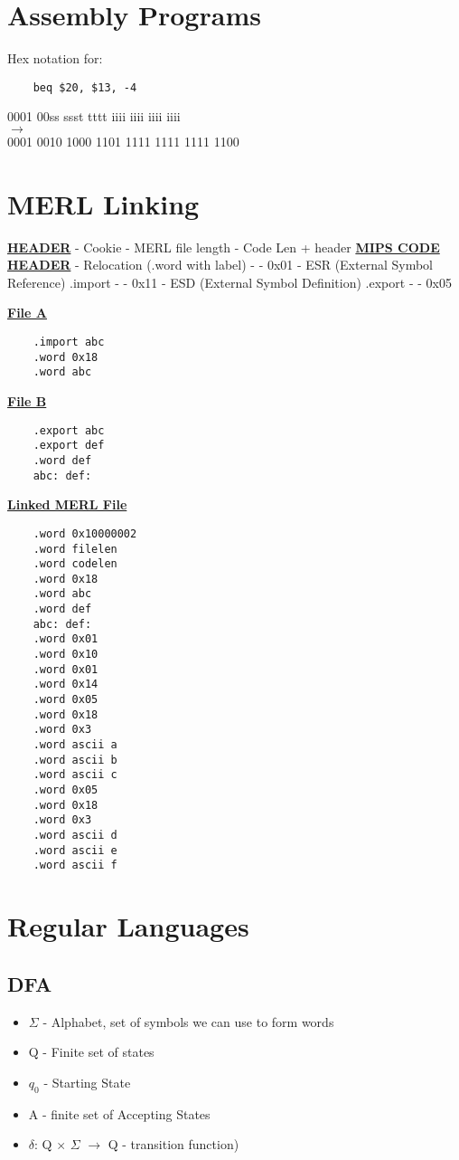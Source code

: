 \documentclass[12pt]{article}
\newcommand{\myt}[1]{\textbf{\underline{#1}}}
\begin{document}
	\section*{Assembly Programs}
	Hex notation for:\\	
	\begin{lstlisting}
	beq $20, $13, -4
	\end{lstlisting}
	0001 00ss ssst tttt iiii iiii iiii iiii\\
	$\rightarrow$\\
	0001 0010 1000 1101 1111 1111 1111 1100\\
	
	\section*{MERL Linking}
	\myt{HEADER}
	- Cookie
	- MERL file length
	- Code Len + header
	\myt{MIPS CODE}
	\myt{HEADER}
	- Relocation (.word with label)
	- - 0x01
	- ESR (External Symbol Reference) .import
	- - 0x11
	- ESD (External Symbol Definition) .export
	- - 0x05
	
	\myt{File A}
	\begin{lstlisting}
	.import abc
	.word 0x18
	.word abc
	\end{lstlisting}
	\myt{File B}
	\begin{lstlisting}
	.export abc
	.export def
	.word def
	abc: def:
	\end{lstlisting}

	\myt{Linked MERL File}
	\begin{lstlisting}
	.word 0x10000002
	.word filelen
	.word codelen
	.word 0x18
	.word abc
	.word def
	abc: def:
	.word 0x01
	.word 0x10
	.word 0x01
	.word 0x14
	.word 0x05
	.word 0x18
	.word 0x3
	.word ascii a
	.word ascii b
	.word ascii c
	.word 0x05
	.word 0x18
	.word 0x3
	.word ascii d
	.word ascii e
	.word ascii f
	\end{lstlisting}

	\section*{Regular Languages}
	
	\subsection*{DFA}
	\begin{itemize}
		\item $\Sigma$ - Alphabet, set of symbols we can use to form words
		\item Q - Finite set of states
		\item $q_0$ - Starting State
		\item A - finite set of Accepting States
		\item $\delta$: Q $\times$ $\Sigma$ $\rightarrow$ Q - transition function)
	\end{itemize}
	
\end{document}
